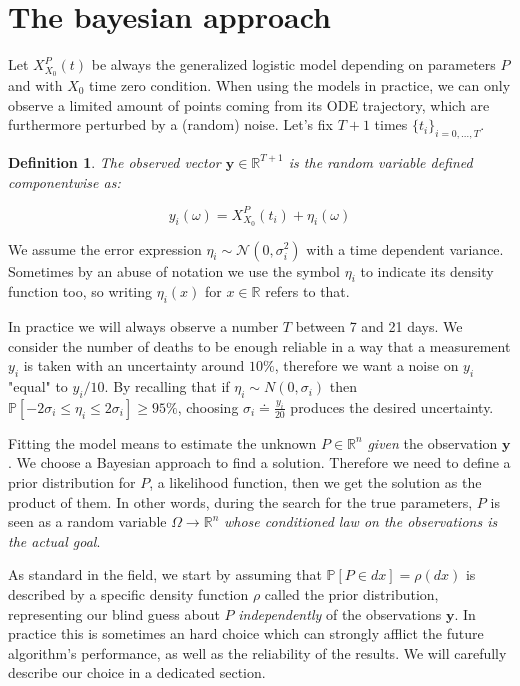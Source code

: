 \documentclass[8pt]{article}
\newtheorem{definition}{Definition}
\begin{document}
\section{The bayesian approach}
Let $X^P_{X_0}(t)$ be always the generalized logistic model depending on
parameters $P$ and with $X_0$ time zero condition.
When using the models in practice, we can only observe a
limited amount of points coming from its ODE trajectory, 
which are furthermore perturbed by a (random) noise.
Let's fix $T+1$ times $\{t_i\}_{i = 0,\dots, T}$.
\begin{definition}
	The \emph{observed vector} $\textbf{y} \in \mathbb{R}^{T+1}$
	is the random variable defined componentwise as:

\begin{equation}
	y_i(\omega) = X^P_{X_0} (t_i) + \eta_i(\omega)
\end{equation}
\end{definition}
We assume the error expression 
$\eta_i \sim \mathcal{N}(0, \sigma^2_i)$ with a time dependent variance.
Sometimes by an abuse of notation 
we use the symbol $\eta_i$ to indicate its density function too,
so writing $\eta_i(x)$ for $x \in \mathbb{R}$ refers to that.


In practice we will always observe a number $T$ between 7 and 21 days.
We consider the number of deaths to be enough reliable in a way
that a measurement $y_i$ is taken with
an uncertainty around $10\%$, therefore we want a noise
on $y_i$ "equal" to $y_i / 10$. By recalling that if
$\eta_i \sim N(0, \sigma_i)$ then 
$\mathbb{P}[ - 2 \sigma_i \leq \eta_i \leq 2 \sigma_i] \geq 95\%$, choosing
$\sigma_i \doteq \frac{y_i}{20}$ produces the desired uncertainty.


Fitting the model means to estimate
the unknown $P \in \mathbb{R}^n$ \emph{given} the observation $\textbf{y}$.
We choose a Bayesian approach to find a solution. Therefore we need
to define a prior distribution for $P$, a likelihood function,
then we get the solution as the product of them.
In other words,
during the search for the true parameters, $P$ is seen as a random
variable $\Omega \to \mathbb{R}^n$ 
\emph{whose conditioned law on the observations is the actual goal}.

As standard in the field, we start by assuming that
$\mathbb{P}[ P \in dx] = \rho(dx)$ is described by a specific 
density function $\rho$ called the prior distribution, 
representing our blind guess about $P$ \emph{independently} of the 
observations $\textbf{y}$. In practice this is sometimes an hard choice
which can strongly afflict the future algorithm's performance, as well as
the reliability of the results. We will carefully describe our choice in
a dedicated section.
\end{document}
